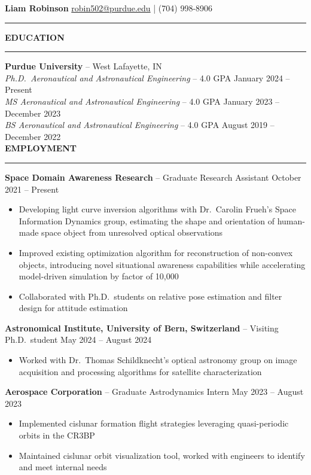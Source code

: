 \documentclass[11pt, a4paper]{article}
\newcommand{\sectiontitle}[1]{{\Large \textbf{#1}}\vspace{0.5em}\hrule\vspace{0.5em}}
\begin{document}
\thispagestyle{empty}

\sffamily
\renewcommand*{\bibfont}{\normalfont\normalsize\sffamily}

\noindent
\textbf{\huge Liam Robinson} \hfill \href{mailto:robin502@purdue.edu}{robin502@purdue.edu} | (704) 998-8906
\rule{\linewidth}{4pt}
\vspace{-0.5em}

\sectiontitle{EDUCATION}
\textbf{Purdue University} -- West Lafayette, IN \\
\textit{Ph.D.\ Aeronautical and Astronautical Engineering} -- 4.0 GPA \hfill January 2024 -- Present \\
\textit{MS Aeronautical and Astronautical Engineering} -- 4.0 GPA \hfill January 2023 -- December 2023 \\
\textit{BS Aeronautical and Astronautical Engineering} -- 4.0 GPA \hfill August 2019 -- December 2022 \\

\sectiontitle{EMPLOYMENT}
\textbf{Space Domain Awareness Research} -- Graduate Research Assistant \hfill October 2021 -- Present
\begin{itemize}[noitemsep]
    \item Developing light curve inversion algorithms with Dr.\ Carolin Frueh's Space Information Dynamics group,
    estimating the shape and orientation of human-made space object from unresolved optical observations
    \item Improved existing optimization algorithm for reconstruction of non-convex objects, introducing novel
    situational awareness capabilities while accelerating model-driven simulation by factor of 10,000
    \item Collaborated with Ph.D.\ students on relative pose estimation and filter design for attitude estimation
\end{itemize}

\textbf{Astronomical Institute, University of Bern, Switzerland} -- Visiting Ph.D.\ student \hfill May 2024 -- August 2024
\begin{itemize}[noitemsep]
    \item Worked with Dr.\ Thomas Schildknecht's optical astronomy group on image acquisition and processing algorithms for satellite characterization
\end{itemize}

\textbf{Aerospace Corporation} -- Graduate Astrodynamics Intern \hfill May 2023 -- August 2023
\begin{itemize}[noitemsep]
    \item Implemented cislunar formation flight strategies leveraging quasi-periodic orbits in the CR3BP
    \item Maintained cislunar orbit visualization tool, worked with engineers to identify and meet internal needs
\end{itemize}
\end{document}
